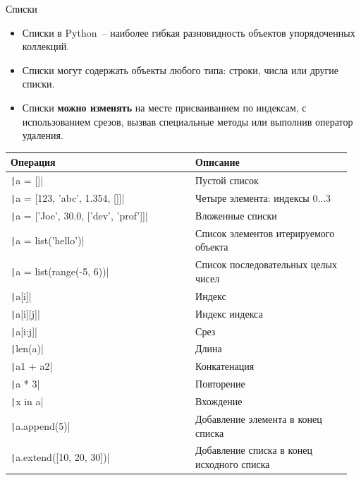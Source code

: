 \documentclass[aspectratio=169, mathserif]{beamer}%
\begin{document}
\begin{frame}[fragile]{Списки}
\scriptsize
\begin{itemize}
\item Списки в Python~-- наиболее гибкая разновидность объектов упорядоченных коллекций. 

\item Списки могут содержать объекты любого типа: строки, числа или другие списки.  

\item Списки \textcolor{extraorange}{\textbf{можно изменять}} на месте присваиванием по индексам, с использованием срезов, вызвав специальные методы или выполнив оператор удаления. 
\end{itemize}

\begin{table}[h!]
\centering
\tiny
\begin{tabular}{|p{0.52\linewidth}|p{0.44\linewidth}|}
\hline
\textbf{Операция} & \textbf{Описание} \\
\hline
\texttt|a = []| & Пустой список \\
\texttt|a = [123, 'abc', 1.354, []]| & Четыре элемента: индексы 0...3 \\
\texttt|a = ['Joe', 30.0, ['dev', 'prof']]| & Вложенные списки \\
\texttt|a = list('hello')| & Список элементов итерируемого объекта \\
\texttt|a = list(range(-5, 6))| & Список последовательных целых чисел \\
\texttt|a[i]| & Индекс \\
\texttt|a[i][j]| & Индекс индекса \\
\texttt|a[i:j]| & Срез \\
\texttt|len(a)| & Длина \\
\texttt|a1 + a2| & Конкатенация \\
\texttt|a * 3| & Повторение \\
\texttt|x in a| & Вхождение \\
\texttt|a.append(5)| & Добавление элемента в конец списка \\
\texttt|a.extend([10, 20, 30])| & Добавление списка в конец исходного списка \\
\hline
\end{tabular}

\end{table}
\vfill
\end{frame}
\end{document}
